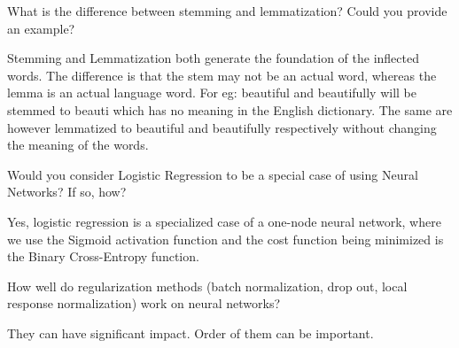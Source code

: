 	\begin{qanda}
		\begin{question}
What is the difference between stemming and lemmatization? Could you provide an example?
		\end{question}
		\begin{answer}
Stemming and Lemmatization both generate the foundation of the inflected words. The difference is that the stem may not be an actual word, whereas the lemma is an actual language word. For eg: beautiful and beautifully will be stemmed to beauti which has no meaning in the English dictionary. The same are however lemmatized to beautiful and beautifully respectively without changing the meaning of the words.
		\end{answer}
	\end{qanda}

	\begin{qanda}
		\begin{question}
Would you consider Logistic Regression to be a special case of using Neural Networks? If so, how?
		\end{question}
		\begin{answer}
Yes, logistic regression is a specialized case of a one-node neural network, where we use the Sigmoid activation function and the cost function being minimized is the Binary Cross-Entropy function.
		\end{answer}
	\end{qanda}

	\begin{qanda}
		\begin{question}
How well do regularization methods (batch normalization, drop out, local response normalization) work on neural networks?
		\end{question}
		\begin{answer}
They can have significant impact.  Order of them can be important.
		\end{answer}
	\end{qanda}%